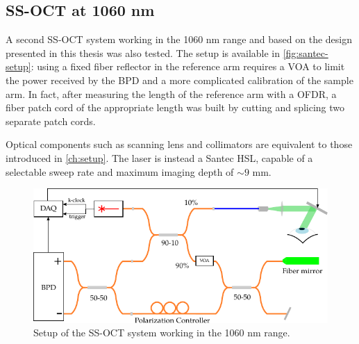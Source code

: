 
%
%


\clearpage
\subsection{SS-OCT at 1060 nm}
A second SS-OCT system working in the 1060 nm range and based on the design presented in this thesis was also tested. The setup is available in \autoref{fig:santec-setup}: using a fixed fiber reflector in the reference arm requires a \ac{VOA} to limit the power received by the BPD and a more complicated calibration of the sample arm. In fact, after measuring the length of the reference arm with a \ac{OFDR}, a fiber patch cord of the appropriate length was built by cutting and splicing two separate patch cords. 

Optical components such as scanning lens and collimators are equivalent to those introduced in \autoref{ch:setup}. The laser is instead a Santec HSL, capable of a selectable sweep rate and maximum imaging depth of $\sim 9$ mm. 


\begin{figure}[htb]
	\centering
	\includegraphics[width=\linewidth]{gfx/ch4//santec-setup}
	\caption{Setup of the SS-OCT system working in the 1060 nm range.}\label{fig:santec-setup}
\end{figure}


